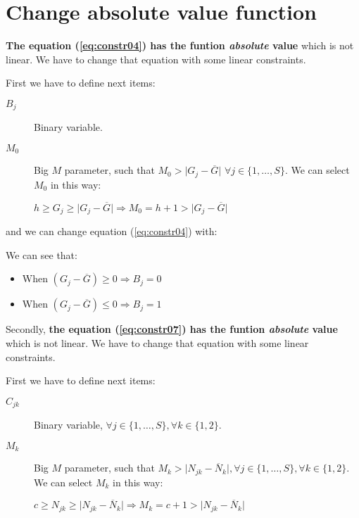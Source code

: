 \documentclass[a4paper,12pt]{article}
\begin{document}


\section{Change absolute value function}\label{sec:absolute}

\textbf{The equation (\ref{eq:constr04}) has the funtion \textit{absolute} value} which is not linear. We have to change that equation with some linear constraints.

First we have to define next items:
\begin{description}
	\item[$B_j$] Binary variable.
	\item[$M_0$] Big $M$ parameter, such that $M_0 > \lvert G_j - \overline{G} \rvert$  $\forall j \in \{1, \ldots , S\}$. We can select $M_0$ in this way: 
	
	$h \ge G_j \ge \lvert G_j - \overline{G} \rvert \Rightarrow M_0 = h+1 > \lvert G_j -  \overline{G} \rvert$
\end{description}

and we can change equation (\ref{eq:constr04}) with:
\begin{lpformulation}
\end{lpformulation}
We can see that:
\begin{itemize}
	\item When $(G_j - \overline{G}) \ge 0 \Longrightarrow B_j = 0$
	\item When $(G_j - \overline{G}) \le 0 \Longrightarrow B_j = 1$
\end{itemize}


Secondly, \textbf{the equation (\ref{eq:constr07}) has the funtion \textit{absolute} value} which is not linear. We have to change that equation with some linear constraints.

First we have to define next items:
\begin{description}
	\item[$C_{jk}$] Binary variable, $\forall j \in \{1, \ldots , S\}, \forall k \in \{1, 2\}$.
	\item[$M_k$] Big $M$ parameter, such that $M_k > \lvert N_{jk} - \overline{N}_k \rvert, \forall j \in \{1, \ldots , S\}, \forall k \in \{1, 2\}$. We can select $M_k$ in this way: 
	
	$c \ge N_{jk} \ge \lvert N_{jk} - \overline{N}_k \rvert \Rightarrow M_k = c+1 > \lvert N_{jk} - \overline{N}_k \rvert$
\end{description}
\end{document}
